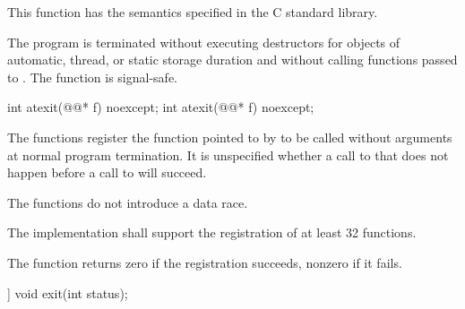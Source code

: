 \begin{itemdescr}
\pnum
\effects
This function has the semantics specified in the C standard library.

\pnum
\remarks
The program is terminated without executing destructors for objects of
automatic, thread, or static storage
duration and without calling functions passed to
.
%
The function  is signal-safe.
\end{itemdescr}

%
\begin{itemdecl}
int atexit(@@* f) noexcept;
int atexit(@@* f) noexcept;
\end{itemdecl}

\begin{itemdescr}
\pnum
\effects
The
functions register the function pointed to by 
to be called without arguments at normal program termination.
It is unspecified whether a call to  that does not
happen before a call to  will succeed.
\begin{note}
The  functions do not introduce a data
race.
\end{note}

\pnum
\implimits
The implementation shall support the registration of at least 32 functions.

\pnum
\returns
The
function returns zero if the registration succeeds,
nonzero if it fails.
\end{itemdescr}

%
\begin{itemdecl}
[[noreturn]] void exit(int status);
\end{itemdecl}

